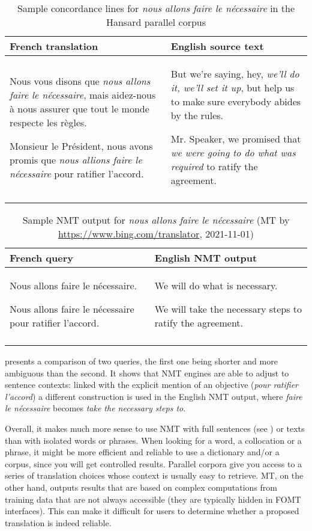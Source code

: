 \documentclass[output=paper,colorlinks,citecolor=brown,
]{langscibook}
\begin{document}
\begin{table}
\begin{tabularx}{\textwidth}{QQ}
\lsptoprule
{French translation} & {English source text}\\
\midrule
Nous vous disons que \textit{nous allons faire le nécessaire}, mais aidez-nous à nous assurer que tout le monde respecte les règles.

Monsieur le Président, nous avons promis que \textit{nous allions faire le nécessaire} pour ratifier l'accord. & But we're saying, hey, \textit{we'll do it, we'll set it up}, but help us to make sure everybody abides by the rules.

Mr. Speaker, we promised that \textit{we were going to do what was required} to ratify the agreement.\\
\lspbottomrule
\end{tabularx}
\caption{Sample concordance lines for \textit{nous allons faire le nécessaire} in the Hansard parallel corpus\label{tab:carre:2}}
\end{table}

\begin{table}
\begin{tabularx}{\textwidth}{QQ}
\lsptoprule
{French query} & {English NMT output}\\
\midrule
Nous allons faire le nécessaire.

Nous allons faire le nécessaire pour ratifier l’accord. & We will do what is necessary.

We will take the necessary steps to ratify the agreement.\\
\lspbottomrule
\end{tabularx}
\caption{Sample NMT output for \textit{nous allons faire le nécessaire} (MT by \url{https://www.bing.com/translator}, 2021-11-01)}
\label{tab:carre:3}
\end{table}

 presents a comparison of two queries, the first one being shorter and more ambiguous than the second. It shows that NMT engines are able to adjust to sentence contexts: linked with the explicit mention of an objective (\textit{pour ratifier l’accord}) a different construction is used in the English NMT output, where \textit{faire le nécessaire} becomes \textit{take the necessary steps to}.

Overall, it makes much more sense to use NMT with full sentences (see ) or texts than with isolated words or phrases. When looking for a word, a collocation or a phrase, it might be more efficient and reliable to use a dictionary and/or a corpus, since you will get controlled results. Parallel corpora give you access to a series of translation choices whose context is usually easy to retrieve. MT, on the other hand, outputs results that are based on complex computations from training data that are not always accessible (they are typically hidden in FOMT interfaces). This can make it difficult for users to determine whether a proposed translation is indeed reliable.
\end{document}
